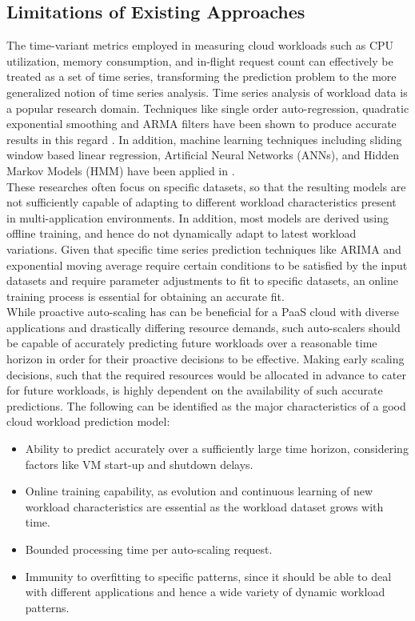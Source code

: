 \subsection{Limitations of Existing Approaches}

The time-variant metrics employed in measuring cloud workloads such as CPU utilization, memory consumption, and in-flight request count can effectively be treated as a set of time series, transforming the prediction problem to the more generalized notion of time series analysis. Time series analysis of workload data is a popular research domain. Techniques like single order auto-regression, quadratic exponential smoothing and ARMA filters have been shown to produce accurate results in this regard \cite{Kupferman_2009} \cite{Mi_2010} \cite{Roy_2011}. In addition, machine learning techniques including sliding window based linear regression, Artificial Neural Networks (ANNs), and Hidden Markov Models (HMM) have been applied in \cite{Yang_2013} \cite{Khan_2012}.\\

These researches often focus on specific datasets, so that the resulting models are not sufficiently capable of adapting to different workload characteristics present in multi-application environments. In addition, most models are derived using offline training, and hence do not dynamically adapt to latest workload variations. Given that specific time series prediction techniques like ARIMA and exponential moving average require certain conditions to be satisfied by the input datasets and require parameter adjustments to fit to specific datasets, an online training process is essential for obtaining an accurate fit.\\

While proactive auto-scaling has can be beneficial for a PaaS cloud with diverse applications and drastically differing resource demands, such auto-scalers should be capable of accurately predicting future workloads over a reasonable time horizon in order for their proactive decisions to be effective. Making early scaling decisions, such that the required resources would be allocated in advance to cater for future workloads, is highly dependent on the availability of such accurate predictions. The following can be identified as the major characteristics of a good cloud workload prediction model:

\begin{itemize}
\item Ability to predict accurately over a sufficiently large time horizon, considering factors like VM start-up and shutdown delays.
\item Online training capability, as evolution and continuous learning of new workload characteristics are essential as the workload dataset grows with time.
\item Bounded processing time per auto-scaling request.
\item Immunity to overfitting to specific patterns, since it should be able to deal with different applications and hence a wide variety of dynamic workload patterns.
\end{itemize}
